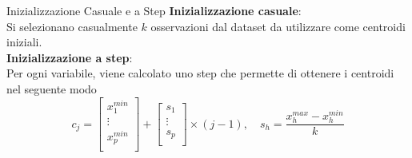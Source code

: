 \documentclass{beamer}
\begin{document}

\begin{frame}{Inizializzazione Casuale e a Step}
    \textbf{Inizializzazione casuale}:\\
    Si selezionano casualmente $k$ osservazioni dal dataset da utilizzare come centroidi iniziali.
    \\[.5cm]
    \pause
    \textbf{Inizializzazione a step}:\\
    Per ogni variabile, viene calcolato uno step che permette di ottenere i centroidi nel seguente modo
    \[
        c_j =
        \begin{bmatrix}
        x^{min}_1\\
        \vdots\\
        x^{min}_p\\
        \end{bmatrix}
        +
        \begin{bmatrix}
        s_1\\
        \vdots\\
        s_p\\
        \end{bmatrix}
        \times (j-1), \quad s_h=\frac{x^{max}_h-x^{min}_h}{k}
    \]
\end{frame}
\end{document}
